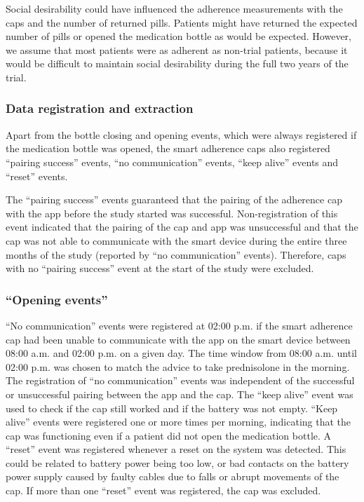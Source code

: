\documentclass{article}
\begin{document}
Social desirability could have influenced the adherence measurements with the caps and the number of returned pills. Patients might have returned the expected number of pills or opened the medication bottle as would be expected. However, we assume that most patients were as adherent as non-trial patients, because it would be difficult to maintain social desirability during the full two years of the trial. 



\subsubsection{Data registration and extraction}

Apart from the bottle closing and opening events, which were always registered if the medication bottle was opened, the smart adherence caps also registered “pairing success” events, “no communication” events, “keep alive” events and “reset” events. 

The “pairing success” events guaranteed that the pairing of the adherence cap with the app before the study started was successful. Non-registration of this event indicated that the pairing of the cap and app was unsuccessful and that the cap was not able to communicate with the smart device during the entire three months of the study (reported by “no communication” events). Therefore, caps with no “pairing success” event at the start of the study were excluded. 



\subsubsection{“Opening events”}

“No communication” events were registered at 02:00 p.m. if the smart adherence cap had been unable to communicate with the app on the smart device between 08:00 a.m. and 02:00 p.m. on a given day. The time window from 08:00 a.m. until 02:00 p.m. was chosen to match the advice to take prednisolone in the morning. The registration of “no communication” events was independent of the successful or unsuccessful pairing between the app and the cap. The “keep alive” event was used to check if the cap still worked and if the battery was not empty. “Keep alive” events were registered one or more times per morning, indicating that the cap was functioning even if a patient did not open the medication bottle. A “reset” event was registered whenever a reset on the system was detected. This could be related to battery power being too low, or bad contacts on the battery power supply caused by faulty cables due to falls or abrupt movements of the cap. If more than one “reset” event was registered, the cap was excluded. 
\end{document}
